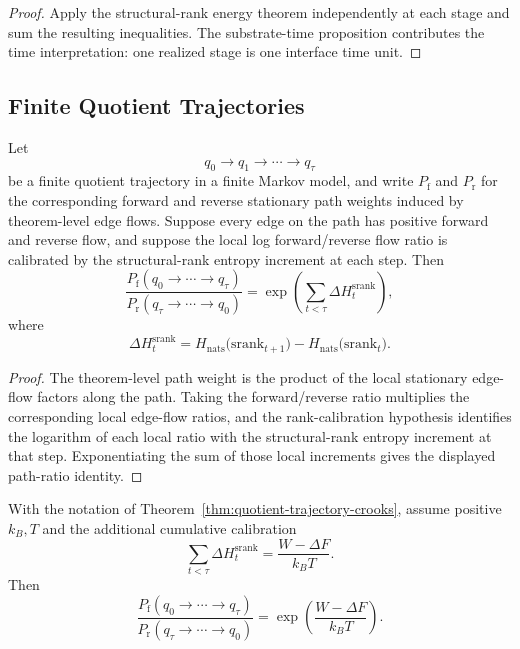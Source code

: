 \begin{proof}
Apply the structural-rank energy theorem independently at each stage and sum the resulting inequalities. The substrate-time proposition contributes the time interpretation: one realized stage is one interface time unit.
\end{proof}

\subsection{Finite Quotient Trajectories}

\begin{theorem}\label{thm:quotient-trajectory-crooks}
Let
\[
q_0 \to q_1 \to \cdots \to q_\tau
\]
be a finite quotient trajectory in a finite Markov model, and write $P_{\mathrm f}$ and $P_{\mathrm r}$ for the corresponding forward and reverse stationary path weights induced by theorem-level edge flows. Suppose every edge on the path has positive forward and reverse flow, and suppose the local log forward/reverse flow ratio is calibrated by the structural-rank entropy increment at each step. Then
\[
\frac{P_{\mathrm f}(q_0 \to \cdots \to q_\tau)}{P_{\mathrm r}(q_\tau \to \cdots \to q_0)}
=
\exp\!\left(\sum_{t<\tau} \Delta H^{\mathrm{srank}}_t\right),
\]
where
\[
\Delta H^{\mathrm{srank}}_t
=
H_{\mathrm{nats}}\bigl(\mathrm{srank}_{t+1}\bigr)-H_{\mathrm{nats}}\bigl(\mathrm{srank}_t\bigr).
\]
\end{theorem}

\begin{proof}
The theorem-level path weight is the product of the local stationary edge-flow factors along the path. Taking the forward/reverse ratio multiplies the corresponding local edge-flow ratios, and the rank-calibration hypothesis identifies the logarithm of each local ratio with the structural-rank entropy increment at that step. Exponentiating the sum of those local increments gives the displayed path-ratio identity.
\end{proof}

\begin{theorem}\label{thm:rank-calibrated-crooks-standard}
With the notation of Theorem~\ref{thm:quotient-trajectory-crooks}, assume positive $k_B,T$ and the additional cumulative calibration
\[
\sum_{t<\tau}\Delta H_t^{\mathrm{srank}}
=
\frac{W-\Delta F}{k_B T}.
\]
Then
\[
\frac{P_{\mathrm f}(q_0\to\cdots\to q_\tau)}{P_{\mathrm r}(q_\tau\to\cdots\to q_0)}
=
\exp\!\left(\frac{W-\Delta F}{k_B T}\right).
\]
\end{theorem}


